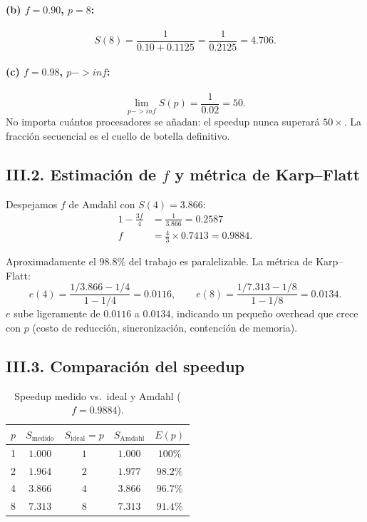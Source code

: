 \documentclass[12pt,a4paper]{article}
\def\to{->}%
\def\infty{inf}%
\begin{document}
\paragraph{\texorpdfstring{(b) $f=0.90$, $p=8$}{(b) f=0.90, p=8}:}
\[
S(8) = \frac{1}{0.10 + 0.1125} = \frac{1}{0.2125} = 4.706.
\]

\paragraph{(c) \texorpdfstring{$f=0.98$, $p\to\infty$}{f=0.98, p->inf}:}
\[
\lim_{p\to\infty} S(p) = \frac{1}{0.02} = 50.
\]
No importa cu\'antos procesadores se a\~nadan: el speedup nunca superar\'a $50\times$. La fracci\'on secuencial es el cuello de botella definitivo.

\subsection[III.2. Estimacion de f y metrica de Karp-Flatt]{III.2. Estimaci\'on de $f$ y m\'etrica de Karp--Flatt}

Despejamos $f$ de Amdahl con $S(4)=3.866$:
\begin{align*}
1 - \frac{3f}{4} &= \frac{1}{3.866} = 0.2587 \\
f &= \frac{4}{3}\times 0.7413 = \boxed{0.9884}.
\end{align*}

Aproximadamente el $98.8\%$ del trabajo es paralelizable. La m\'etrica de Karp--Flatt:
\[
e(4) = \frac{1/3.866 - 1/4}{1 - 1/4} = 0.0116,
\qquad
e(8) = \frac{1/7.313 - 1/8}{1 - 1/8} = 0.0134.
\]
$e$ sube ligeramente de $0.0116$ a $0.0134$, indicando un peque\~no overhead que crece con $p$ (costo de reducci\'on, sincronizaci\'on, contenci\'on de memoria).

\subsection{III.3. Comparaci\'on del speedup}

\begin{table}[ht]
  \centering
  \caption{Speedup medido vs.\ ideal y Amdahl ($f=0.9884$).}
  \label{tab:speedup-comp}
  \begin{tabular}{rcccc}
    \toprule
    $p$ & $S_{\mathrm{medido}}$ & $S_{\mathrm{ideal}}=p$ & $S_{\mathrm{Amdahl}}$ & $E(p)$ \\
    \midrule
    1 & $1.000$ & $1$   & $1.000$ & $100\%$ \\
    2 & $1.964$ & $2$   & $1.977$ & $98.2\%$ \\
    4 & $3.866$ & $4$   & $3.866$ & $96.7\%$ \\
    8 & $7.313$ & $8$   & $7.313$ & $91.4\%$ \\
    \bottomrule
  \end{tabular}
\end{table}
\end{document}
